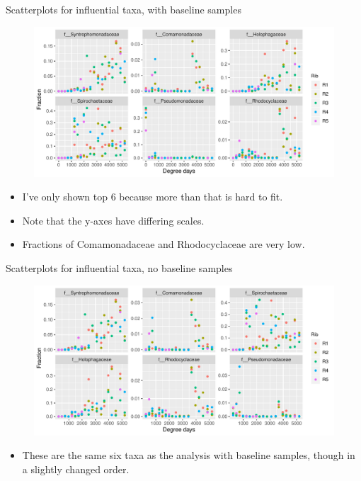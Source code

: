 \documentclass{beamer}
\begin{document}
\begin{frame}{Scatterplots for influential taxa, with baseline samples}

  \begin{center}
    \begin{figure}
      \includegraphics[width=4.75in]{HenleyLake/bacteria/use_families/w_ribs/w_baseline/infl_rib_family_scatter}
    \end{figure}
  \end{center}
  \vspace{-0.25in}
  {\scriptsize
  \begin{itemize}
  \item I've only shown top 6 because more than that is hard to fit.
  \item Note that the y-axes have differing scales.
  \item Fractions of Comamonadaceae and Rhodocyclaceae are very low.
  \end{itemize}
  }

\end{frame}


\begin{frame}{Scatterplots for influential taxa, no baseline samples}

  \begin{center}
    \begin{figure}
      \includegraphics[width=4.75in]{HenleyLake/bacteria/use_families/w_ribs/no_baseline/infl_rib_family_no_baseline_scatter}
    \end{figure}
  \end{center}
  \vspace{-0.25in}
  {\scriptsize
  \begin{itemize}
  \item These are the same six taxa as the analysis with baseline samples, though in a slightly changed order.
  \end{itemize}
  }

\end{frame}
\end{document}
